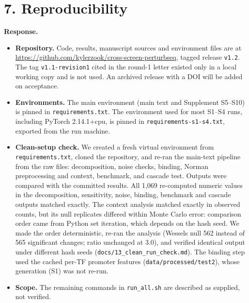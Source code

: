 \documentclass[10pt]{article}
\newcommand{\resp}{\par\smallskip\noindent\textbf{Response.} }
\begin{document}
\section*{7. Reproducibility}
\resp
\begin{itemize}
\item \textbf{Repository.} Code, results, manuscript sources and environment files are at \url{https://github.com/kylerzook/cross-screen-perturbseq}, tagged release \texttt{v1.2}. The tag \texttt{v1.1-revision1} cited in the round-1 letter existed only in a local working copy and is not used. An archived release with a DOI will be added on acceptance.
\item \textbf{Environments.} The main environment (main text and Supplement S5--S10) is pinned in \texttt{requirements.txt}. The environment used for most S1--S4 runs, including PyTorch 2.14.1+cpu, is pinned in \texttt{requirements-s1-s4.txt}, exported from the run machine.
\item \textbf{Clean-setup check.} We created a fresh virtual environment from \texttt{requirements.txt}, cloned the repository, and re-ran the main-text pipeline from the raw files: decomposition, noise checks, binding, Norman preprocessing and context, benchmark, and cascade test. Outputs were compared with the committed results. All 1{,}069 re-computed numeric values in the decomposition, sensitivity, noise, binding, benchmark and cascade outputs matched exactly. The context analysis matched exactly in observed counts, but its null replicates differed within Monte Carlo error: comparison order came from Python set iteration, which depends on the hash seed. We made the order deterministic, re-ran the analysis (Wessels null 562 instead of 565 significant changes; ratio unchanged at 3.0), and verified identical output under different hash seeds (\texttt{docs/13\_clean\_run\_check.md}). The binding step used the cached per-TF promoter features (\texttt{data/processed/test2}), whose generation (S1) was not re-run.
\item \textbf{Scope.} The remaining commands in \texttt{run\_all.sh} are described as supplied, not verified.
\end{itemize}
\end{document}
